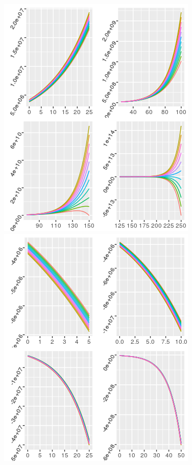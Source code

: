\documentclass[12pt]{article}
\begin{document}
\includegraphics[scale=0.7]{q3p2.png}
\includegraphics[scale=0.7]{q3p3.png}
\end{document}
